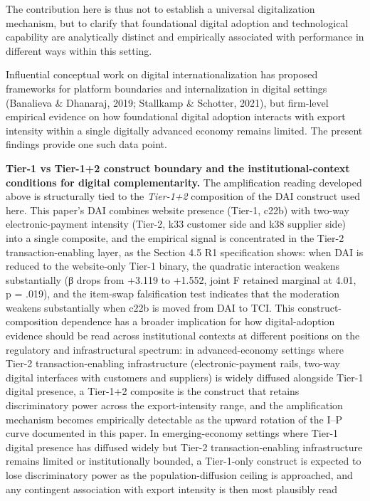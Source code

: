 \documentclass[
  12pt,a4paper]{article}
\begin{document}
The contribution here is thus not to establish a universal
digitalization mechanism, but to clarify that foundational digital
adoption and technological capability are analytically distinct and
empirically associated with performance in different ways within this
setting.

Influential conceptual work on digital internationalization has proposed
frameworks for platform boundaries and internalization in digital
settings (Banalieva \& Dhanaraj, 2019; Stallkamp \& Schotter, 2021), but
firm-level empirical evidence on how foundational digital adoption
interacts with export intensity within a single digitally advanced
economy remains limited. The present findings provide one such data
point.

\textbf{Tier-1 vs Tier-1+2 construct boundary and the
institutional-context conditions for digital complementarity.} The
amplification reading developed above is structurally tied to the
\emph{Tier-1+2} composition of the DAI construct used here. This paper's
DAI combines website presence (Tier-1, c22b) with two-way
electronic-payment intensity (Tier-2, k33 customer side and k38 supplier
side) into a single composite, and the empirical signal is concentrated
in the Tier-2 transaction-enabling layer, as the Section 4.5 R1
specification shows: when DAI is reduced to the website-only Tier-1
binary, the quadratic interaction weakens substantially (β drops from
+3.119 to +1.552, joint F retained marginal at 4.01, p = .019), and the
item-swap falsification test indicates that the moderation weakens
substantially when c22b is moved from DAI to TCI. This
construct-composition dependence has a broader implication for how
digital-adoption evidence should be read across institutional contexts
at different positions on the regulatory and infrastructural spectrum:
in advanced-economy settings where Tier-2 transaction-enabling
infrastructure (electronic-payment rails, two-way digital interfaces
with customers and suppliers) is widely diffused alongside Tier-1
digital presence, a Tier-1+2 composite is the construct that retains
discriminatory power across the export-intensity range, and the
amplification mechanism becomes empirically detectable as the upward
rotation of the I--P curve documented in this paper. In emerging-economy
settings where Tier-1 digital presence has diffused widely but Tier-2
transaction-enabling infrastructure remains limited or institutionally
bounded, a Tier-1-only construct is expected to lose discriminatory
power as the population-diffusion ceiling is approached, and any
contingent association with export intensity is then most plausibly read
\end{document}
